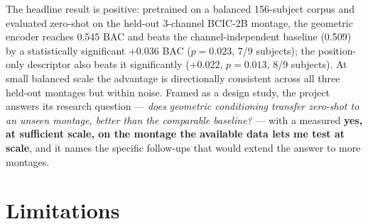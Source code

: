 \documentclass[11pt]{article}
\begin{document}
The headline result is positive: pretrained on a balanced 156-subject corpus
and evaluated zero-shot on the held-out 3-channel BCIC-2B montage, the
geometric encoder reaches 0.545 BAC and beats the channel-independent
baseline (0.509) by a statistically significant $+0.036$ BAC ($p = 0.023$,
7/9 subjects); the position-only descriptor also beats it significantly
($+0.022$, $p = 0.013$, 8/9 subjects). At small balanced scale the advantage
is directionally consistent across all three held-out montages but within
noise. Framed as a design study, the project answers its research question
--- \emph{does geometric conditioning transfer zero-shot to an unseen
montage, better than the comparable baseline?} --- with a measured
\textbf{yes, at sufficient scale, on the montage the available data lets me
test at scale}, and it names the specific follow-ups that would extend the
answer to more montages.

\section{Limitations}
\label{sec:limitations}
\end{document}
